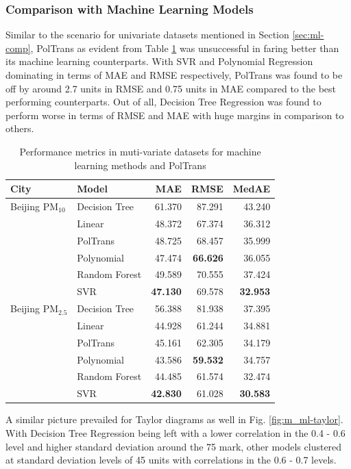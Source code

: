 \documentclass[twocolumn]{svjour3}          %
\begin{document}
\subsubsection{Comparison with Machine Learning Models}

Similar to the scenario for univariate datasets mentioned in Section \ref{sec:ml-comp}, {PolTrans} as evident from Table \ref{tbl:m_ml-performance} was unsuccessful in faring better than its machine learning counterparts. With SVR and Polynomial Regression dominating in terms of MAE and RMSE respectively, {PolTrans} was found to be off by around 2.7 units in RMSE and 0.75 units in MAE compared to the best performing counterparts. Out of all, Decision Tree Regression was found to perform worse in terms of RMSE and MAE with huge margins in comparison to others.

\begin{table}[h]
\small
\centering
\tabcolsep=0.16cm
\caption{Performance metrics in muti-variate datasets for machine learning methods and PolTrans}
\label{tbl:m_ml-performance}
\begin{tabular}{llrrr}
\toprule
City & Model & MAE & RMSE & MedAE \\
\midrule
Beijing PM${_{10}}$ & Decision Tree & 61.370 & 87.291 & 43.240 \\
& Linear & 48.372 & 67.374 & 36.312 \\
& PolTrans & 48.725 & 68.457 & 35.999 \\
& Polynomial & 47.474 & \textbf{66.626} & 36.055 \\
& Random Forest & 49.589 & 70.555 & 37.424 \\
& SVR & \textbf{47.130} & 69.578 & \textbf{32.953} \\
Beijing PM${_{2.5}}$ & Decision Tree & 56.388 & 81.938 & 37.395 \\
& Linear & 44.928 & 61.244 & 34.881 \\
& PolTrans & 45.161 & 62.305 & 34.179 \\
& Polynomial & 43.586 & \textbf{59.532} & 34.757 \\
& Random Forest & 44.485 & 61.574 & 32.474 \\
& SVR & \textbf{42.830} & 61.028 & \textbf{30.583} \\
\bottomrule
\end{tabular}
\end{table}

A similar picture prevailed for Taylor diagrams as well in Fig. \ref{fig:m_ml-taylor}. With Decision Tree Regression being left with a lower correlation in the 0.4 - 0.6 level and higher standard deviation around the 75 mark, other models clustered at standard deviation levels of 45 units with correlations in the 0.6 - 0.7 levels.
\end{document}
